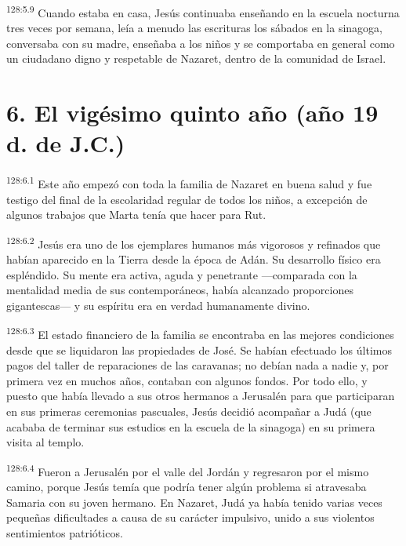 \par 
\textsuperscript{128:5.9} Cuando estaba en casa, Jesús continuaba enseñando en la escuela nocturna tres veces por semana, leía a menudo las escrituras los sábados en la sinagoga, conversaba con su madre, enseñaba a los niños y se comportaba en general como un ciudadano digno y respetable de Nazaret, dentro de la comunidad de Israel.

\section*{6. El vigésimo quinto año (año 19 d. de J.C.)}
\par 
\textsuperscript{128:6.1} Este año empezó con toda la familia de Nazaret en buena salud y fue testigo del final de la escolaridad regular de todos los niños, a excepción de algunos trabajos que Marta tenía que hacer para Rut.

\par 
\textsuperscript{128:6.2} Jesús era uno de los ejemplares humanos más vigorosos y refinados que habían aparecido en la Tierra desde la época de Adán. Su desarrollo físico era espléndido. Su mente era activa, aguda y penetrante ---comparada con la mentalidad media de sus contemporáneos, había alcanzado proporciones gigantescas--- y su espíritu era en verdad humanamente divino.

\par 
\textsuperscript{128:6.3} El estado financiero de la familia se encontraba en las mejores condiciones desde que se liquidaron las propiedades de José. Se habían efectuado los últimos pagos del taller de reparaciones de las caravanas; no debían nada a nadie y, por primera vez en muchos años, contaban con algunos fondos. Por todo ello, y puesto que había llevado a sus otros hermanos a Jerusalén para que participaran en sus primeras ceremonias pascuales, Jesús decidió acompañar a Judá (que acababa de terminar sus estudios en la escuela de la sinagoga) en su primera visita al templo.

\par 
\textsuperscript{128:6.4} Fueron a Jerusalén por el valle del Jordán y regresaron por el mismo camino, porque Jesús temía que podría tener algún problema si atravesaba Samaria con su joven hermano. En Nazaret, Judá ya había tenido varias veces pequeñas dificultades a causa de su carácter impulsivo, unido a sus violentos sentimientos patrióticos.

